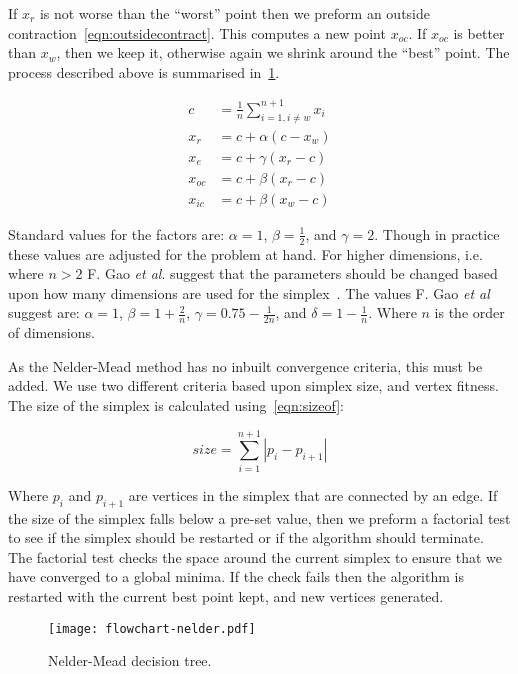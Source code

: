 If $x_r$ is not worse than the ``worst'' point then we preform an outside contraction~\cref{eqn:outsidecontract}.
This computes a new point $x_{oc}$.
If $x_{oc}$ is better than $x_w$, then we keep it, otherwise again we shrink around the ``best'' point.
The process described above is summarised in~\cref{fig:NM-algo}.

\begin{align}
c &= \frac{1}{n}\sum \limits_{i=1,i\neq w}^{n+1} x_i \label{eqn:centroid}\\
x_r &= c + \alpha(c - x_w)\label{eqn:reflect}\\
x_e &= c + \gamma(x_r - c)\label{eqn:expand}\\
x_{oc} &= c + \beta(x_r - c)\label{eqn:outsidecontract}\\
x_{ic} &= c + \beta(x_w - c)\label{eqn:insidecontract}
\end{align}

Standard values for the factors are: $\alpha=1$, $\beta=\frac{1}{2}$, and $\gamma=2$.
Though in practice these values are adjusted for the problem at hand.
For higher dimensions, i.e. where $n > 2$ F. Gao \textit{et al}. suggest that the parameters should be changed based upon how many dimensions are used for the simplex~\cite{gao2012implementing}.
The values F. Gao \textit{et al} suggest are: $\alpha=1$, $\beta=1+\tfrac{2}{n}$, $\gamma=0.75-\tfrac{1}{2n}$, and $\delta=1-\tfrac{1}{n}$.
Where $n$ is the order of dimensions.

As the Nelder-Mead method has no inbuilt convergence criteria, this must be added.
We use two different criteria based upon simplex size, and vertex fitness.
The size of the simplex is calculated using~\cref{eqn:sizeof}:

\begin{equation}
size=\sum\limits_{i=1}^{n+1}|p_{i}-p_{i+1}|
\label{eqn:sizeof}
\end{equation}

Where $p_i$ and $p_{i+1}$ are vertices in the simplex that are connected by an edge. 
If the size of the simplex falls below a pre-set value, then we preform a factorial test to see if the simplex should be restarted or if the algorithm should terminate.
The factorial test checks the space around the current simplex to ensure that we have converged to a global minima.
If the check fails then the algorithm is restarted with the current best point kept, and new vertices generated.

\begin{figure}[!htbp]
    \centering
    \texttt{[image: flowchart-nelder.pdf]}
    \caption{Nelder-Mead decision tree.}
    \label{fig:NM-algo}
\end{figure}

